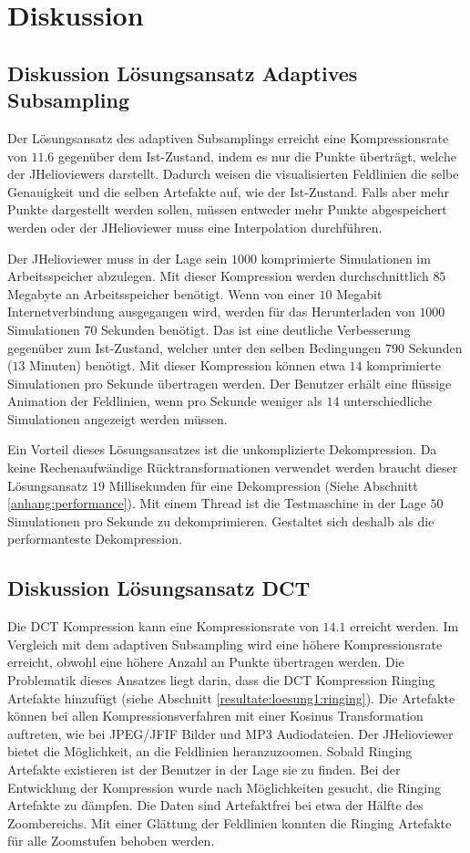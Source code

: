 \section{Diskussion}

\subsection{Diskussion Lösungsansatz Adaptives Subsampling}
Der Lösungsansatz des adaptiven Subsamplings erreicht eine Kompressionsrate von $11.6$ gegenüber dem Ist-Zustand, indem es nur die Punkte überträgt, welche der JHelioviewers darstellt. Dadurch weisen die visualisierten Feldlinien die selbe Genauigkeit und die selben Artefakte auf, wie der Ist-Zustand. Falls aber mehr Punkte dargestellt werden sollen, müssen entweder mehr Punkte abgespeichert werden oder der JHelioviewer muss eine Interpolation durchführen.

Der JHelioviewer muss in der Lage sein $1000$ komprimierte Simulationen im Arbeitsspeicher abzulegen. Mit dieser Kompression werden durchschnittlich $85$ Megabyte an Arbeitsspeicher benötigt. Wenn von einer $10$ Megabit Internetverbindung ausgegangen wird, werden für das Herunterladen von $1000$ Simulationen $70$ Sekunden benötigt. Das ist eine deutliche Verbesserung gegenüber zum Ist-Zustand, welcher unter den selben Bedingungen $790$ Sekunden ($13$ Minuten) benötigt. Mit dieser Kompression können etwa $14$ komprimierte Simulationen pro Sekunde übertragen werden. Der Benutzer erhält eine flüssige Animation der Feldlinien, wenn pro Sekunde weniger als $14$ unterschiedliche Simulationen angezeigt werden müssen.

Ein Vorteil dieses Lösungsansatzes ist die unkomplizierte Dekompression. Da keine Rechenaufwändige Rücktransformationen verwendet werden braucht dieser Lösungsansatz $19$ Millisekunden für eine Dekompression (Siehe Abschnitt \ref{anhang:performance}). Mit einem Thread ist die Testmaschine in der Lage $50$ Simulationen pro Sekunde zu dekomprimieren. Gestaltet sich deshalb als die performanteste Dekompression.

\subsection{Diskussion Lösungsansatz DCT}
Die DCT Kompression kann eine Kompressionsrate von $14.1$ erreicht werden. Im Vergleich mit dem adaptiven Subsampling wird eine höhere Kompressionsrate erreicht, obwohl eine höhere Anzahl an Punkte übertragen werden. Die Problematik dieses Ansatzes liegt darin, dass die DCT Kompression Ringing Artefakte hinzufügt (siehe Abschnitt \ref{resultate:loesung1:ringing}). Die Artefakte können bei allen Kompressionsverfahren mit einer Kosinus Transformation auftreten, wie bei JPEG/JFIF Bilder und MP3 Audiodateien. Der JHelioviewer bietet die Möglichkeit, an die Feldlinien heranzuzoomen. Sobald Ringing Artefakte existieren ist der Benutzer in der Lage sie zu finden. Bei der Entwicklung der Kompression wurde nach Möglichkeiten gesucht, die Ringing Artefakte zu dämpfen. Die Daten sind Artefaktfrei bei etwa der Hälfte des Zoombereichs. Mit einer Glättung der Feldlinien konnten die Ringing Artefakte für alle Zoomstufen behoben werden. 

